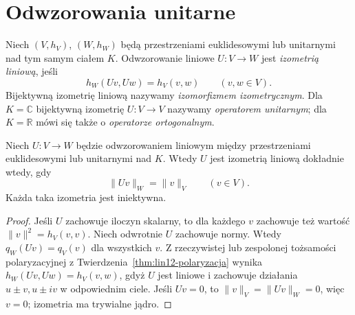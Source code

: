 \section{Odwzorowania unitarne}
\label{sec:lin12-izometrie}

\begin{definicja}
\label{def:lin12-unitarny}
Niech \((V,h_V)\), \((W,h_W)\)
będą przestrzeniami euklidesowymi
lub unitarnymi nad tym samym ciałem \(K\).
Odwzorowanie liniowe \(U\colon V\to W\)
jest \emph{izometrią liniową},
jeśli
\[
 h_W(Uv,Uw)=h_V(v,w)
 \qquad(v,w\in V).
\]
Bijektywną izometrię liniową
nazywamy \emph{izomorfizmem izometrycznym}.
Dla \(K=\mathbb C\) bijektywną
izometrię \(U\colon V\to V\)
nazywamy \emph{operatorem unitarnym};
dla \(K=\mathbb R\) mówi się także
o \emph{operatorze ortogonalnym}.
\end{definicja}

\begin{stwierdzenie}
\label{prop:lin12-norma-izometrii}
Niech \(U\colon V\to W\) będzie
odwzorowaniem liniowym między
przestrzeniami euklidesowymi
lub unitarnymi nad \(K\).
Wtedy \(U\) jest izometrią liniową
dokładnie wtedy, gdy
\[
 \|Uv\|_W=\|v\|_V\qquad(v\in V).
\]
Każda taka izometria jest iniektywna.
\end{stwierdzenie}
\begin{proof}
Jeśli \(U\) zachowuje iloczyn
skalarny, to dla każdego \(v\)
zachowuje też wartość
\(\|v\|^2=h_V(v,v)\).
Niech odwrotnie \(U\) zachowuje
normy. Wtedy
\(q_W(Uv)=q_V(v)\)
dla wszystkich \(v\).
Z rzeczywistej lub zespolonej
tożsamości polaryzacyjnej z
Twierdzenia~\ref{thm:lin12-polaryzacja}
wynika
\(h_W(Uv,Uw)=h_V(v,w)\),
gdyż \(U\) jest liniowe
i zachowuje działania
\(u\pm v,u\pm iv\)
w odpowiednim ciele.
Jeśli \(Uv=0\), to
\(\|v\|_V=\|Uv\|_W=0\),
więc \(v=0\); izometria
ma trywialne jądro.
\end{proof}

